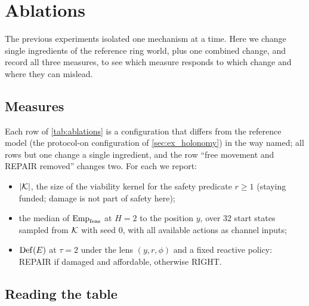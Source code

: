 \section{Ablations}
\label{sec:ex_ablations}

The previous experiments isolated one mechanism at a time. Here we change single ingredients of the reference ring world, plus one combined change, and record all three measures, to see which measure responds to which change and where they can mislead.

\subsection{Measures}
Each row of \cref{tab:ablations} is a configuration that differs from the reference model (the protocol-on configuration of \cref{sec:ex_holonomy}) in the way named; all rows but one change a single ingredient, and the row ``free movement and REPAIR removed'' changes two. For each we report:
\begin{itemize}[leftmargin=*, itemsep=0.2em]
  \item $|\mathcal{K}|$, the size of the viability kernel for the safety predicate $r\ge1$ (staying funded; damage is not part of safety here);
  \item the median of $\mathrm{Emp}_{\mathrm{feas}}$ at $H=2$ to the position $y$, over 32 start states sampled from $\mathcal{K}$ with seed $0$, with all available actions as channel inputs;
  \item $\Def(E)$ at $\tau=2$ under the lens $(y,r,\phi)$ and a fixed reactive policy: REPAIR if damaged and affordable, otherwise RIGHT.
\end{itemize}

\begin{table}[t]
\centering
\small

\caption{Ablations of the reference ring world (two phases with protocol, ledger $0$--$2$, movement cost $1$, free REPAIR, no income, $p_{\mathrm{flip}}=0.1$, $p_{\mathrm{slip}}=0.2$). ``States'' is the size of the state space. Median empowerment is at $H=2$ over 32 sampled viable states; $\Def(E)$ is at $\tau=2$ under the reactive policy described in the text. Adding LEARN doubles the state space and adds a channel input, so that row is not directly comparable with the others.}
\label{tab:ablations}
\end{table}

\subsection{Reading the table}

